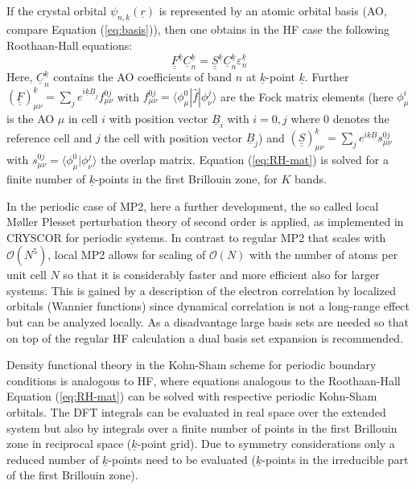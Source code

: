 \documentclass[11pt,DIV=13,BCOR=5mm,a4paper,headinclude]{scrbook}
\renewcommand{\vec}[1]{\underline{#1}}
\def\doubleunderline#1{\underline{\underline{#1}}}
\begin{document}
If the crystal orbital $\psi_{n,\vec{k}}(\vec{r})$ is represented by an atomic orbital basis (AO, compare Equation (\ref{eq:basis})), then one obtains in the HF case the following Roothaan-Hall equations:
\begin{equation}\label{eq:RH-mat}
  \doubleunderline{F}^{\vec{k}}\vec{C}_n^{\vec{k}}=\doubleunderline{S}^{\vec{k}}\vec{C}_n^{\vec{k}}\varepsilon_n^{\vec{k}}
\end{equation}
Here, $\vec{C}_n^{\vec{k}}$ contains the AO coefficients of band $n$ at $\vec{k}$-point $\vec{k}$.
Further $(\doubleunderline{F})^{\vec{k}}_{\mu\nu}=\sum_j e^{i\vec{k}\vec{B}_j} f_{\mu\nu}^{0j}$ with $f_{\mu\nu}^{0j}=\langle \phi_{\mu}^0|\hat{f}|\phi_{\nu}^j\rangle$ are the Fock matrix elements
(here $\phi_\mu^i$ is the AO $\mu$ in cell $i$ with position vector $\vec{B}_i$ with $i=0,j$ where $0$ denotes the reference cell and $j$ the cell with position vector $\vec{B}_j$)
and $(\doubleunderline{S})^{\vec{k}}_{\mu\nu}=\sum_j e^{i\vec{k}\vec{B}}s^{0j}_{\mu\nu}$ with $s^{0j}_{\mu\nu}=\langle \phi_{\mu}^0|\phi_{\nu}^j\rangle$ the overlap matrix.
Equation (\ref{eq:RH-mat}) is solved for a finite number of $\vec{k}$-points in the first Brillouin zone, for $K$ bands.

In the periodic case of MP2, here a further development, the so called local M\o{}ller Plesset perturbation theory of second order\cite{usvyat2015,usvyatbook,Maschio2007} is applied, as implemented in CRYSCOR\cite{cryscor} for periodic systems.
In contrast to regular MP2 that scales with $\mathcal{O}(N^5)$, local MP2 allows for scaling of $\mathcal{O}(N)$ with the number of atoms per unit cell $N$ so that it is considerably faster and more efficient also for larger systems.
This is gained by a description of the electron correlation by localized orbitals (Wannier functions) since dynamical correlation is not a long-range effect but can be analyzed locally.
As a disadvantage large basis sets are needed so that on top of the regular HF calculation a dual basis set expansion is recommended\cite{Usvyat2010}.


Density functional theory in the Kohn-Sham scheme for periodic boundary conditions is analogous to HF, where equations analogous to the Roothaan-Hall Equation (\ref{eq:RH-mat}) can be solved with respective periodic Kohn-Sham orbitals. %
The DFT integrals can be evaluated in real space over the extended system but also by integrals over a finite number of points in the first Brillouin zone in reciprocal space ($\vec{k}$-point grid).
Due to symmetry considerations only a reduced number of $\vec{k}$-points need to be evaluated ($\vec{k}$-points in the irreducible part of the first Brillouin zone).
\end{document}
